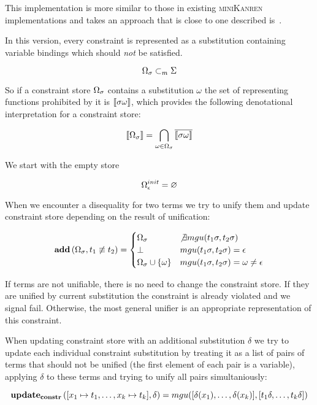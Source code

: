 This implementation is more similar to those in existing \textsc{miniKanren} implementations and takes an approach that is close to one described is~\cite{CKanren}.

In this version, every constraint is represented as a substitution containing variable bindings which should \emph{not} be satisfied.

\[ \Omega_\sigma \subset_m \Sigma \]

So if a constraint store $\Omega_\sigma$ contains a substitution $\omega$ the set of representing functions prohibited by it is $\llbracket{\sigma \omega}\rrbracket$,
which provides the following denotational interpretation for a constraint store:

\[ \llbracket{\Omega_\sigma}\rrbracket = \bigcap_{\omega \in \Omega_\sigma} \overline{ \llbracket{\sigma \omega}\rrbracket } \]

We start with the empty store

\[ \Omega_\epsilon^{init} = \varnothing \]

When we encounter a disequality for two terms we try to unify them and update constraint store depending on the result of unification:

\[
\mathbf{add}\,(\Omega_\sigma, t_1 \not\equiv t_2) =
    \begin{cases}
       \Omega_\sigma                                & \not\exists mgu(t_1 \sigma, t_2 \sigma) \\
       \bot                                                 & mgu(t_1 \sigma, t_2 \sigma) = \epsilon \\
       \Omega_\sigma \cup \{\omega\}      & mgu(t_1 \sigma, t_2 \sigma) = \omega \neq \epsilon
    \end{cases}
\]

If terms are not unifiable, there is no need to change the constraint store. If they are unified by current substitution the constraint is already violated and we signal fail.
Otherwise, the most general unifier is an appropriate representation of this constraint.

When updating constraint store with an additional substitution $\delta$ we try to update each individual constraint substitution by treating it
as a list of pairs of terms that should not be unified (the first element of each pair is a variable), applying $\delta$ to these terms and trying to
unify all pairs simultaniously:

\[ \mathbf{update_{constr}}\,([x_1 \mapsto t_1, \dots, x_k \mapsto t_k], \delta) = mgu([\delta(x_1), \dots, \delta(x_k)],[t_1 \delta, \dots, t_k \delta]) \]

